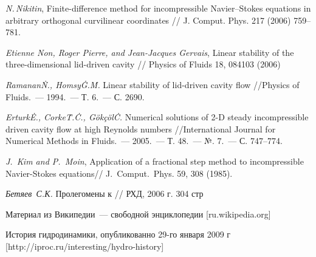 \begin{thebibliography}{99}

  \textit{N.\,Nikitin}, Finite-difference method for incompressible Navier–Stokes equations in 
  arbitrary orthogonal curvilinear coordinates // J. Comput. Phys. 217 (2006) 759–781.

  \textit{Etienne Non, Roger Pierre, and Jean-Jacques Gervais}, Linear stability of the 
  three-dimensional lid-driven cavity // Physics of Fluids 18, 084103 (2006)
  
   \textit{Ramanan\.N., Homsy\.G.\.M.} Linear stability of lid-driven cavity flow 
  //Physics of Fluids.~--- 1994.~--- Т. 6.~--- С. 2690.
  
   \textit{Erturk\.E., Corke\.T.\.C., Gökçöl\.C.} Numerical solutions of 2-D steady incompressible
  driven cavity flow at high Reynolds numbers //International Journal for Numerical Methods in 
  Fluids.~--- 2005.~--- Т. 48.~--- №. 7.~--- С. 747--774.

	\textit{J.~Kim and P.~Moin}, Application of a fractional step method to incompressible Navier-Stokes equations//
 J.~Comput.~Phys. 59, 308 (1985).

   \textit{Бетяев~С.К.} Пролегомены к // РХД, 2006 г. 304 стр
  
   Материал из Википедии~--- свободной энциклопедии [ru.wikipedia.org]

   История гидродинамики, опубликованно 29-го января 2009 г [http://iproc.ru/interesting/hydro-history]

\end{thebibliography}

